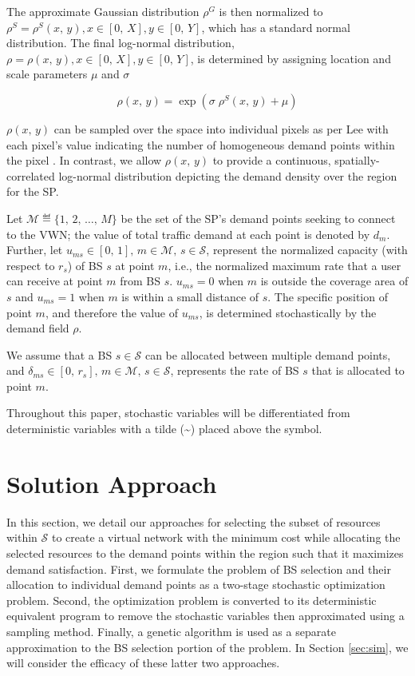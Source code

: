 \documentclass[onecolumn,draftcls]{IEEEtran}
\begin{document}
The approximate Gaussian distribution $\rho^G$ is then normalized to $\rho^S = \rho^S\left(x,\, y\right), x \in [0,\, X], y \in [0,\, Y]$, which has a standard normal distribution.  The final log-normal distribution, $\rho = \rho\left(x,\, y\right), x \in [0,\, X], y \in [0,\, Y]$, is determined by assigning location and scale parameters $\mu$ and $\sigma$

\begin{equation}
\rho\left(x,\, y\right) = \exp\left(\sigma \; \rho^S\left(x,\, y\right)+\mu\right)
\end{equation}

$\rho\left(x,\, y\right)$ can be sampled over the space into individual pixels as per Lee with each pixel's value indicating the number of homogeneous demand points within the pixel \cite{6554749}.  In contrast, we allow $\rho\left(x,\, y\right)$ to provide a continuous, spatially-correlated log-normal distribution depicting the demand density over the region for the SP.

Let $\mathcal{M} \eqdef \{1,\, 2,\, \ldots,\, M\}$ be the set of the SP's demand points seeking to connect to the VWN; the value of total traffic demand at each point is denoted by $d_m$.  Further, let $u_{ms} \in [0,\, 1],\, m \in \mathcal{M},\, s \in \mathcal{S}$, represent the normalized capacity (with respect to $r_s$) of BS $s$ at point $m$, i.e., the normalized maximum rate that a user can receive at point $m$ from BS $s$.  $u_{ms} = 0$ when $m$ is outside the coverage area of $s$ and $u_{ms} = 1$ when $m$ is within a small distance of $s$.  The specific position of point $m$, and therefore the value of $u_{ms}$, is determined stochastically by the demand field $\rho$.

We assume that a BS $s \in \mathcal{S}$ can be allocated between multiple demand points, and $\delta_{ms} \in [0,\, r_s],\, m \in \mathcal{M},\, s \in \mathcal{S}$, represents the rate of BS $s$ that is allocated to point $m$.

Throughout this paper, stochastic variables will be differentiated from deterministic variables with a tilde (\textasciitilde) placed above the symbol.

\section{Solution Approach} \label{sec:approach}
In this section, we detail our approaches for selecting the subset of resources within $\mathcal{S}$ to create a virtual network with the minimum cost while allocating the selected resources to the demand points within the region such that it maximizes demand satisfaction.  First, we formulate the problem of BS selection and their allocation to individual demand points as a two-stage stochastic optimization problem.  Second, the optimization problem is converted to its deterministic equivalent program to remove the stochastic variables then approximated using a sampling method.  Finally, a genetic algorithm is used as a separate approximation to the BS selection portion of the problem.  In Section \ref{sec:sim}, we will consider the efficacy of these latter two approaches.
\end{document}
